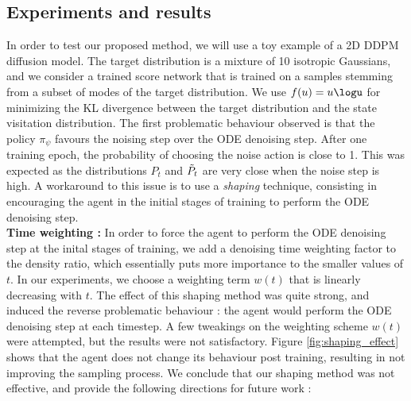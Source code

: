 \subsection{Experiments and results}
In order to test our proposed method, we will use a toy example of a 2D DDPM diffusion model. The target distribution is a mixture of 10 isotropic Gaussians, and we consider a trained score network that is trained on a samples stemming from a subset of modes of the target distribution. We use $f(u) = u\logu$ for minimizing the KL divergence between the target distribution and the state visitation distribution.
The first problematic behaviour observed is that the policy $\pi_{\psi}$ favours the noising step over the ODE denoising step. After one training epoch, the probability of choosing the noise action is close to 1. This was expected as the distributions $P_{t}$ and $\Tilde{P}_{t}$ are very close when the noise step is high. A workaround to this issue is to use a \textit{shaping} technique, consisting in encouraging the agent in the initial stages of training to perform the ODE denoising step.
\\
\textbf{Time weighting :} In order to force the agent to perform the ODE denoising step at the inital stages of training, we add a denoising time weighting factor to the density ratio, which essentially puts more importance to the smaller values of $t$. In our experiments, we choose a weighting term $w(t)$ that is linearly decreasing with $t$.
The effect of this shaping method was quite strong, and induced the reverse problematic behaviour : the agent would perform the ODE denoising step at each timestep. A few tweakings on the weighting scheme $w(t)$ were attempted, but the results were not satisfactory.
Figure \ref{fig:shaping_effect} shows that the agent does not change its behaviour post training, resulting in not improving the sampling process. We conclude that our shaping method was not effective, and provide the following directions for future work :
